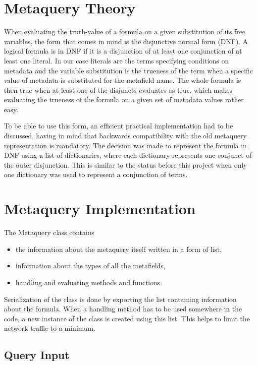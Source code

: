 \section{Metaquery Theory}

When evaluating the truth-value of a formula on a given substitution of its free variables, the 
form that comes in mind is the disjunctive normal form (DNF). A logical formula is in DNF if
it is a disjunction of at least one conjunction of at least one literal. In our case literals 
are the terms specifying conditions on metadata and the variable substitution is the trueness
of the term when a specific value of metadata is substituted for the metafield name. The whole
formula is then true when at least one of the disjuncts evaluates as true, which makes evaluating
the trueness of the formula on a given set of metadata values rather easy.

To be able to use this form, an efficient practical implementation had to be discussed, having in 
mind that backwards compatibility with the old metaquery representation is mandatory. The decision 
was made to represent the formula in DNF using a list of dictionaries, where each dictionary 
represents one conjunct of the outer disjunction. This is similar to the status before this project
when only one dictionary was used to represent a conjunction of terms. 

\section{Metaquery Implementation}

The Metaquery class contains 
\begin{itemize}
\item the information about the metaquery itself written in a form of list,
\item information about the types of all the metafields,
\item handling and evaluating methods and functions.
\end{itemize}
Serialization of the class is done by exporting the list containing information about the formula. 
When a handling method has to be used somewhere in the code, a new instance of the class is created 
using this list. This helps to limit the network traffic to a minimum. 

\subsection{Query Input}


